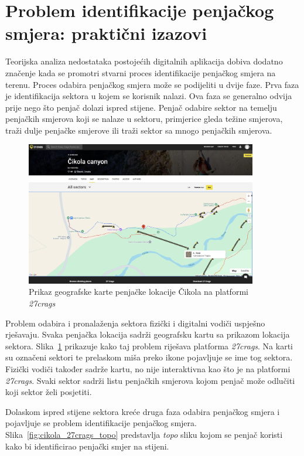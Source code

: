 \section{Problem identifikacije penjačkog smjera: praktični izazovi}

Teorijska analiza nedostataka postojećih digitalnih aplikacija dobiva dodatno značenje kada se promotri stvarni proces identifikacije penjačkog smjera na terenu. Proces odabira penjačkog smjera može se podijeliti u dvije faze. Prva faza je identifikacija sektora u kojem se korisnik nalazi. Ova faza se generalno odvija prije nego što penjač dolazi ispred stijene. Penjač odabire sektor na temelju penjačkih smjerova koji se nalaze u sektoru, primjerice gleda težine smjerova, traži dulje penjačke smjerove ili traži sektor sa mnogo penjačkih smjerova.
\begin{figure}[H]
    \centering
    \includegraphics[width=0.9\textwidth]{images/analiza/cikola_27crags_map.jpeg}
    \caption{Prikaz geografske karte penjačke lokacije Čikola na platformi \textit{27crags}}
    \label{fig:cikola_27crags_map}
\end{figure} 
Problem odabira i pronalaženja sektora fizički i digitalni vodiči uspješno rješavaju. Svaka penjačka lokacija sadrži geografsku kartu sa prikazom lokacija sektora. Slika~\ref{fig:cikola_27crags_map} prikazuje kako taj problem riješava platforma \textit{27crags}. Na karti su označeni sektori te prelaskom miša preko ikone pojavljuje se ime tog sektora. Fizički vodiči također sadrže kartu, no nije interaktivna kao što je na platformi \textit{27crags}. Svaki sektor sadrži listu penjačkih smjerova kojom penjač može odlučiti koji sektor želi posjetiti.

Dolaskom ispred stijene sektora kreće druga faza odabira penjačkog smjera i pojavljuje se problem identifikacije penjačkog smjera. Slika~\ref{fig:cikola_27crags_topo} predstavlja \textit{topo} sliku kojom se penjač koristi kako bi identificirao penjački smjer na stijeni.

